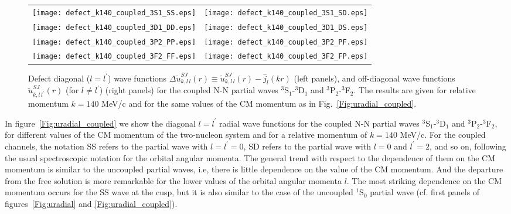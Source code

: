\documentclass[aps,twocolumn,showpacs,preprintnumbers,amsmath,amssymb,nofootinbib,superscriptaddress,showkeys,noeprint]{revtex4-1}
\begin{document}
\begin{figure*}[!ht]
\begin{tabular}{cc}
\texttt{[image: defect\_k140\_coupled\_3S1\_SS.eps]}&
\texttt{[image: defect\_k140\_coupled\_3S1\_SD.eps]}\\
\texttt{[image: defect\_k140\_coupled\_3D1\_DD.eps]}&
\texttt{[image: defect\_k140\_coupled\_3D1\_DS.eps]}\\
\texttt{[image: defect\_k140\_coupled\_3P2\_PP.eps]}&
\texttt{[image: defect\_k140\_coupled\_3P2\_PF.eps]}\\
\texttt{[image: defect\_k140\_coupled\_3F2\_FF.eps]}&
\texttt{[image: defect\_k140\_coupled\_3F2\_FP.eps]}\\
\end{tabular}
\caption{Defect diagonal ($l=l^\prime$) wave functions
  $\Delta\widetilde{u}^{SJ}_{k,l\,l}(r)\equiv
  \widetilde{u}^{SJ}_{k,l\,l}(r)-\hat{j}_l(kr)$ (left panels), and
  off-diagonal wave functions $\widetilde{u}^{SJ}_{k,l\,l^\prime}(r)$
  (for $l\ne l^\prime$) (right panels) for the coupled N-N partial
  waves ${}^{3}$S$_1$-${}^{3}$D$_1$ and
  ${}^{3}$P$_2$-${}^{3}$F$_2$. The results are given for relative
  momentum $k=140$ MeV/c and for the same values of the CM momentum as
  in Fig.~\ref{Fig:uradial_coupled}.}
\label{Fig:defect_coupled}
\end{figure*}

In figure~\ref{Fig:uradial_coupled} we show the diagonal $l=l^\prime$
radial wave functions for the coupled N-N partial waves
${}^{3}$S$_1$-${}^{3}$D$_1$ and ${}^{3}$P$_2$-${}^{3}$F$_2$, for
different values of the CM momentum of the two-nucleon system and for
a relative momentum of $k=140$ MeV/c. For the coupled channels, the
notation SS refers to the partial wave with $l=l^\prime=0$, SD refers
to the partial wave with $l=0$ and $l^\prime=2$, and so on, following
the usual spectroscopic notation for the orbital angular momenta.  The
general trend with respect to the dependence of them on the CM
momentum is similar to the uncoupled partial waves, i.e, there is
little dependence on the value of the CM momentum. And the departure
from the free solution is more remarkable for the lower values of the
orbital angular momenta $l$.  The most striking dependence on the CM
momentum occurs for the SS wave at the cusp, but it is also similar to
the case of the uncoupled ${}^{1}$S$_0$ partial wave (cf. first panels
of figures~\ref{Fig:uradial} and \ref{Fig:uradial_coupled}).
\end{document}
